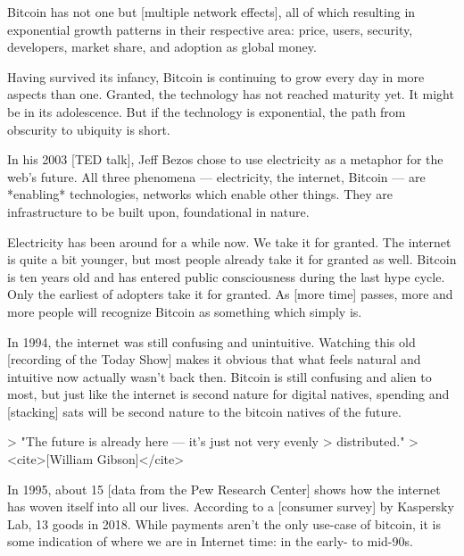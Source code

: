 {%

Bitcoin has not one but [multiple network effects], all of which
resulting in exponential growth patterns in their respective area:
price, users, security, developers, market share, and adoption as global
money.

Having survived its infancy, Bitcoin is continuing to grow every day in
more aspects than one. Granted, the technology has not reached maturity
yet. It might be in its adolescence. But if the technology is
exponential, the path from obscurity to ubiquity is short.

{%

In his 2003 [TED talk], Jeff Bezos chose to use electricity as a
metaphor for the web's future. All three phenomena --- electricity, the
internet, Bitcoin --- are *enabling* technologies, networks which enable
other things. They are infrastructure to be built upon, foundational in
nature.

Electricity has been around for a while now. We take it for granted. The
internet is quite a bit younger, but most people already take it for
granted as well. Bitcoin is ten years old and has entered public
consciousness during the last hype cycle. Only the earliest of adopters
take it for granted. As [more time] passes, more and more people will
recognize Bitcoin as something which simply is.

In 1994, the internet was still confusing and unintuitive. Watching this
old [recording of the Today Show] makes it obvious that what feels
natural and intuitive now actually wasn't back then. Bitcoin is still
confusing and alien to most, but just like the internet is second nature
for digital natives, spending and [stacking] sats will be second nature
to the bitcoin natives of the future.

> "The future is already here --- it's just not very evenly
> distributed."
> <cite>[William Gibson]</cite>

In 1995, about 15%
[data from the Pew Research Center] shows how the internet has woven
itself into all our lives. According to a [consumer survey] by Kaspersky
Lab, 13%
goods in 2018. While payments aren't the only use-case of bitcoin, it is
some indication of where we are in Internet time: in the early- to
mid-90s.

}}
